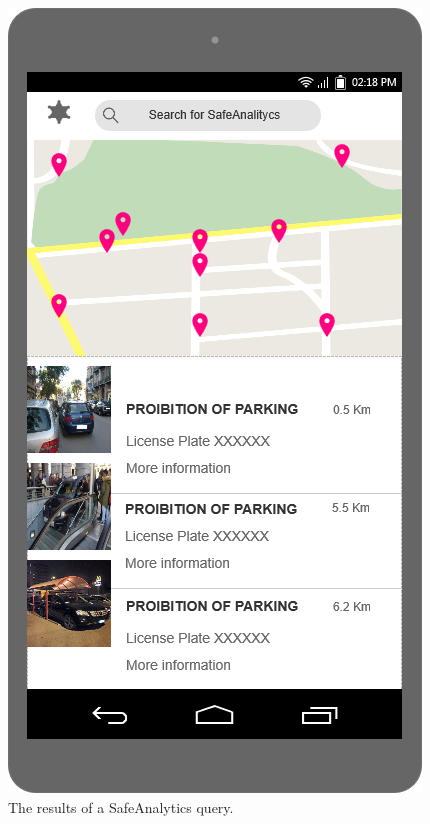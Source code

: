 \documentclass[./main.tex]{subfiles}
\begin{document}
\begin{figure}
\begin{minipage}[t]{\mockupdimension}
    \end{minipage}
    \hfill
    \begin{minipage}[t]{\mockupdimension}
        \includegraphics[width=\textwidth]{resources/Mockups/analytics_results}
        \caption{The results of a SafeAnalytics query.}
        \label{fig:analytics_results}
    \end{minipage}
\end{figure}
\end{document}
